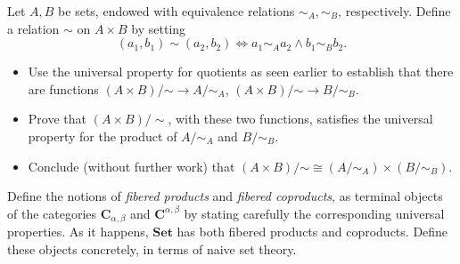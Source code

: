 \documentclass[11pt]{report}
\newcommand{\tildesim}{\mathbin{\sim}}
\begin{document}
\begin{exercise}
	Let $A,B$ be sets, endowed with equivalence relations $\sim_A,\sim _B$, respectively. Define a relation $\sim $ on $A\times B$ by setting
	\[
		(a_1,b_1)\sim (a_2,b_2) \iff a_1\sim_A a_2 \land b_1\sim_B b_2
	.\]
	\begin{itemize}
		\item Use the universal property for quotients as seen earlier to establish that there are functions $(A\times B) /\tildesim \to A /\tildesim_A$, $(A\times B) /\tildesim \to B /\tildesim_B$.
		\item Prove that $(A\times B) /\tildesim $, with these two functions, satisfies the universal property for the product of $A /\tildesim_A$ and $B /\tildesim_B$.
		\item Conclude (without further work) that $(A\times B) /\tildesim \cong (A /\tildesim_A)\times (B /\tildesim_B)$.
	\end{itemize}
\end{exercise}
\begin{exercise}
	Define the notions of \emph{fibered products} and \emph{fibered coproducts}, as terminal objects of the categories $\mathbf{C}_{\alpha ,\beta }$ and $\mathbf{C}^{\alpha ,\beta }$ by stating carefully the corresponding universal properties. As it happens, $\mathbf{Set}$ has both fibered products and coproducts. Define these objects concretely, in terms of naive set theory.
\end{exercise}
\end{document}
